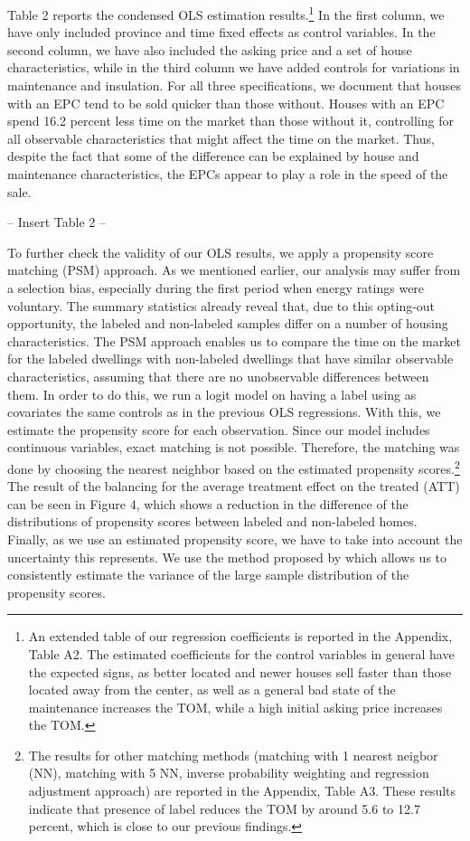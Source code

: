 \documentclass[12pt]{article}
\begin{document}
Table 2 reports the condensed OLS estimation results.\footnote{An extended table of our regression coefficients is reported in the Appendix, Table A2. The estimated coefficients for the control variables in general have the expected signs, as better located and newer houses sell faster than those located away from the center, as well as a general bad state of the maintenance increases the TOM, while a high initial asking price increases the TOM.} In the first column, we have only included province and time fixed effects as control variables. In the second column, we have also included the asking price and a set of house characteristics, while in the third column we have added controls for variations in maintenance and insulation. For all three specifications, we document that houses with an EPC tend to be sold quicker than those without. Houses with an EPC spend 16.2 percent less time on the market than those without it, controlling for all observable characteristics that might affect the time on the market. Thus, despite the fact that some of the difference can be explained by house and maintenance characteristics, the EPCs appear to play a role in the speed of the sale.

\begin{center}
-- Insert Table 2 --
\end{center}

To further check the validity of our OLS results, we apply a propensity score matching (PSM) approach. As we mentioned earlier, our analysis may suffer from a selection bias, especially during the first period when energy ratings were voluntary. The summary statistics already reveal that, due to this opting-out opportunity, the labeled and non-labeled samples differ on a number of housing characteristics. The PSM approach enables us to compare the time on the market for the labeled dwellings with non-labeled dwellings that have similar observable characteristics, assuming that there are no unobservable differences between them. In order to do this, we run a logit model on having a label using as covariates the same controls as in the previous OLS regressions. With this, we estimate the propensity score for each observation. Since our model includes continuous variables, exact matching is not possible. Therefore, the matching was done by choosing the nearest neighbor based on the estimated propensity scores.\footnote{The results for other matching methods (matching with 1 nearest neigbor (NN), matching with 5 NN, inverse probability weighting and regression adjustment approach) are reported in the Appendix, Table A3. These results indicate that presence of label reduces the TOM by around 5.6 to 12.7 percent, which is close to our previous findings.} The result of the balancing for the average treatment effect on the treated (ATT) can be seen in Figure 4, which shows a reduction in the difference of the distributions of propensity scores between labeled and non-labeled homes. Finally, as we use an estimated propensity score, we have to take into account the uncertainty this represents. We use the method proposed by \cite{abadie2016matching} which allows us to consistently estimate the variance of the large sample distribution of the propensity scores.
\end{document}
